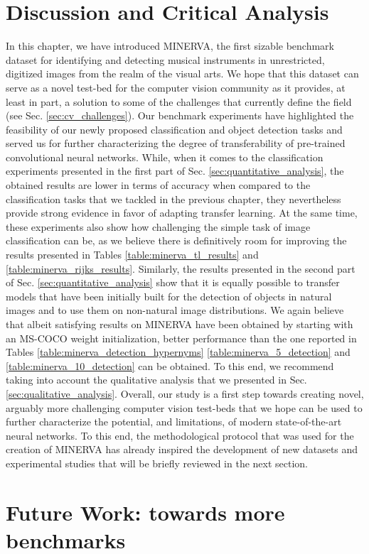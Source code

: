 \section{Discussion and Critical Analysis}
\label{sec:discussion}
In this chapter, we have introduced MINERVA, the first sizable benchmark dataset for identifying and detecting musical instruments in unrestricted, digitized images from the realm of the visual arts. We hope that this dataset can serve as a novel test-bed for the computer vision community as it provides, at least in part, a solution to some of the challenges that currently define the field (see Sec. \ref{sec:cv_challenges}). Our benchmark experiments have highlighted the feasibility of our newly proposed classification and object detection tasks and served us for further characterizing the degree of transferability of pre-trained convolutional neural networks. While, when it comes to the classification experiments presented in the first part of Sec. \ref{sec:quantitative_analysis}, the obtained results are lower in terms of accuracy when compared to the classification tasks that we tackled in the previous chapter, they nevertheless provide strong evidence in favor of adapting transfer learning. At the same time, these experiments also show how challenging the simple task of image classification can be, as we believe there is definitively room for improving the results presented in Tables \ref{table:minerva_tl_results} and \ref{table:minerva_rijks_results}. Similarly, the results presented in the second part of Sec. \ref{sec:quantitative_analysis} show that it is equally possible to transfer models that have been initially built for the detection of objects in natural images and to use them on non-natural image distributions. We again believe that albeit satisfying results on MINERVA have been obtained by starting with an MS-COCO weight initialization, better performance than the one reported in Tables \ref{table:minerva_detection_hypernyms} \ref{table:minerva_5_detection} and \ref{table:minerva_10_detection} can be obtained. To this end, we recommend taking into account the qualitative analysis that we presented in Sec. \ref{sec:qualitative_analysis}. Overall, our study is a first step towards creating novel, arguably more challenging computer vision test-beds that we hope can be used to further characterize the potential, and limitations, of modern state-of-the-art neural networks. To this end, the methodological protocol that was used for the creation of MINERVA has already inspired the development of new datasets and experimental studies that will be briefly reviewed in the next section.

\section{Future Work: towards more benchmarks}
\label{sec:future_work}
